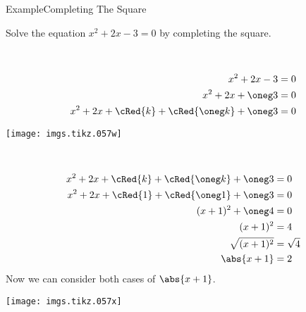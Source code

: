 \documentclass[\string~/GitHub/sthlmNordBeamerTheme/sthlmNordLightDemo.tex]{subfiles}
\begin{document}
\begin{frame}{Example}{Completing The Square}

	\prob Solve the equation \( x^2 + 2x - 3 = 0 \) by completing the square.


	\framebreak
	\soln \hfill\\
	\begin{minipage}[t]{0.5\textwidth}
		\vspace{0pt}
		\begin{align*}
			x^2 + 2x - 3                                   & = 0 \\
			x^2 + 2x + \oneg 3                             & = 0 \\
			x^2 + 2x + \cRed{k} + \cRed{\oneg k} + \oneg 3 & = 0
		\end{align*}
	\end{minipage}
	\hspace{0.05\textwidth}
	\begin{minipage}[t]{0.4\textwidth}
		\vspace{0pt}
		\begin{center}
			\texttt{[image: imgs.tikz.057w]}
		\end{center}
	\end{minipage}
	\hfill

	\framebreak

	\hfill\\
	\begin{minipage}[t]{0.5\textwidth}
		\vspace{0pt}
		\begin{align*}
			x^2 + 2x + \cRed{k} + \cRed{\oneg k} + \oneg 3 & = 0        \\
			x^2 + 2x + \cRed{1} + \cRed{\oneg 1} + \oneg 3 & = 0        \\
			(x + 1)^2 + \oneg 4                            & = 0        \\
			(x + 1)^2                                      & = 4        \\
			\sqrt{(x + 1)^2}                               & = \sqrt{4} \\
			\abs{x + 1}                                    & = 2
		\end{align*}
		Now we can consider both cases of \( \abs{x + 1} \).
	\end{minipage}
	\hspace{0.05\textwidth}
	\begin{minipage}[t]{0.4\textwidth}
		\vspace{0pt}
		\begin{center}
			\texttt{[image: imgs.tikz.057x]}
		\end{center}
	\end{minipage}
	\hfill


\end{frame}
\end{document}
